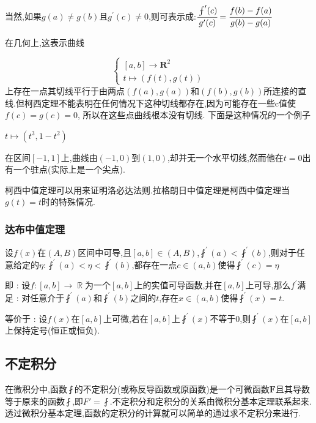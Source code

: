 \documentclass[UTF8,12pt]{ctexbook}
\newcommand{\derivative}{^\prime}
\newcommand{\fDerivative}[1]{\fint\derivative(#1)}
\newcommand{\defFunction}[1]{f(#1)}
\newcommand{\mediumBigCase}[1]{\left[#1\right]}
\DeclareMathOperator{\mathRealNumberCollection}{\mathbb{R}}
\begin{document}
{{{{  当然,如果$g(a) \neq g(b)$且$g\derivative(c) \neq 0$,则可表示成:$\cfrac{\fDerivative{c}}{g\derivative(c)} = \cfrac{\defFunction{b} - \defFunction{a}}{g(b) - g(a)}$

  在几何上,这表示曲线

  $$
    \begin{cases}
      [a,b] \to \mathbf{R}^2 \\
      t \mapsto (f(t), g(t))
    \end{cases}
  $$
  上存在一点其切线平行于由两点$(\defFunction{a}, g(a))$和$(\defFunction{b}, g(b))$所连接的直线.但柯西定理不能表明在任何情况下这种切线都存在,因为可能存在一些c值使$\defFunction{c} = g(c) = 0$, 所以在这些点曲线根本没有切线.
  下面是这种情况的一个例子

  $t \mapsto (t^3, 1-t^2)$

  在区间$[-1,1]$上,曲线由$(-1, 0)$到$(1,0)$,却并无一个水平切线,然而他在$t = 0$出有一个驻点(实际上是一个尖点).

  柯西中值定理可以用来证明洛必达法则.拉格朗日中值定理是柯西中值定理当$g(t) = t$时的特殊情况.
}%

\subsubsection{达布中值定理}{
  设$\defFunction{x}$在$(A,B)$区间中可导,且$\mediumBigCase{a,b} \in (A,B)$,$\fDerivative{a} < \fDerivative{b}$,则对于任意给定的$\eta : \fDerivative{a} < \eta < \fDerivative{b}$,都存在一点$c \in (a,b)$使得$\fDerivative{c} = \eta$

  即 : 设$f : \mediumBigCase{a,b} \to \mathRealNumberCollection$为一个$\mediumBigCase{a,b}$上的实值可导函数,并在$\mediumBigCase{a,b}$上可导,那么$f\derivative$满足 : 对任意介于$\fDerivative{a}$和$\fDerivative{b}$之间的$t$,存在$x \in (a,b)$使得$\fDerivative{x} = t$.

  等价于 : 设$\defFunction{x}$在$\mediumBigCase{a,b}$上可微,若在$\mediumBigCase{a,b}$上$\fDerivative{x}$不等于0,则$\fDerivative{x}$在$\mediumBigCase{a,b}$上保持定号(恒正或恒负).
}%

}%

\subsection{不定积分}{
  在微积分中,函数$\fint$的不定积分(或称反导函数或原函数)是一个可微函数$\mathbf{F}$且其导数等于原来的函数$\fint$,即$F\prime = \fint$.不定积分和定积分的关系由微积分基本定理联系起来.透过微积分基本定理,函数的定积分的计算就可以简单的通过求不定积分来进行.

}}}
\end{document}
